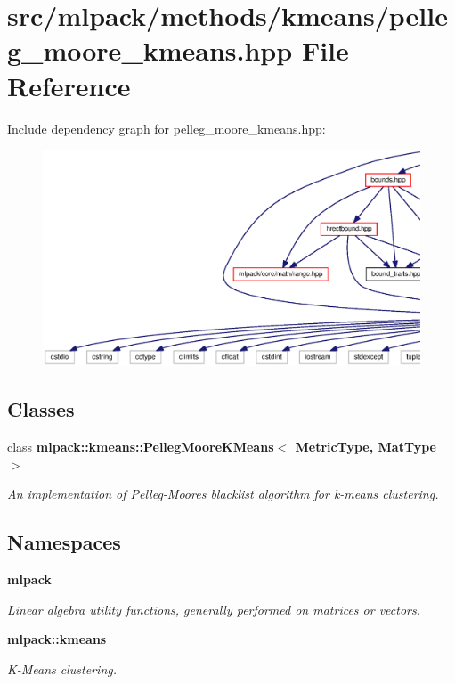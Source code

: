 \section{src/mlpack/methods/kmeans/pelleg\+\_\+moore\+\_\+kmeans.hpp File Reference}
\label{pelleg__moore__kmeans_8hpp}
Include dependency graph for pelleg\+\_\+moore\+\_\+kmeans.\+hpp\+:
\nopagebreak
\begin{figure}[H]
\begin{center}
\leavevmode
\includegraphics[width=350pt]{pelleg__moore__kmeans_8hpp__incl}
\end{center}
\end{figure}
\subsection*{Classes}
\begin{DoxyCompactItemize}
\item 
class {\bf mlpack\+::kmeans\+::\+Pelleg\+Moore\+K\+Means$<$ Metric\+Type, Mat\+Type $>$}
\begin{DoxyCompactList}\small\item\em An implementation of Pelleg-\/\+Moore\textquotesingle{}s \textquotesingle{}blacklist\textquotesingle{} algorithm for k-\/means clustering. \end{DoxyCompactList}\end{DoxyCompactItemize}
\subsection*{Namespaces}
\begin{DoxyCompactItemize}
\item 
 {\bf mlpack}
\begin{DoxyCompactList}\small\item\em Linear algebra utility functions, generally performed on matrices or vectors. \end{DoxyCompactList}\item 
 {\bf mlpack\+::kmeans}
\begin{DoxyCompactList}\small\item\em K-\/\+Means clustering. \end{DoxyCompactList}\end{DoxyCompactItemize}


